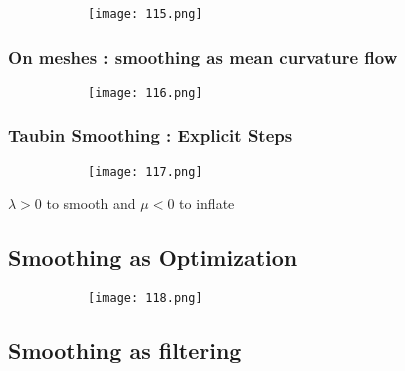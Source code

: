 \documentclass{article}
\begin{document}
    \begin{figure}[ht!]
  \centering
  \begin{subfigure}[b]{0.4\linewidth}
    \texttt{[image: 115.png]}
  \end{subfigure}
\end{figure}

\subsubsection{On meshes : smoothing as mean curvature flow}


    \begin{figure}[ht!]
  \centering
  \begin{subfigure}[b]{0.7\linewidth}
    \texttt{[image: 116.png]}
  \end{subfigure}
\end{figure}

\vspace{30mm}


\subsubsection{Taubin Smoothing : Explicit Steps}

    \begin{figure}[ht!]
  \centering
  \begin{subfigure}[b]{0.7\linewidth}
    \texttt{[image: 117.png]}
  \end{subfigure}
\end{figure}

$\lambda > 0$ to smooth and $\mu < 0 $ to inflate

\subsection{Smoothing as Optimization}


    \begin{figure}[ht!]
  \centering
  \begin{subfigure}[b]{0.7\linewidth}
    \texttt{[image: 118.png]}
  \end{subfigure}
\end{figure}

\vspace{50mm}

\subsection{Smoothing as filtering}
\end{document}
